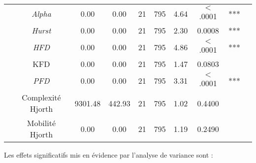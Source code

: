 \begin{table}[!t]
\begin{tabular}{|l|*{9}{c|}}
\hline
& \textit{Alpha} & 0.00 & 0.00 & 21 & 795 & 4.64 & $<$.0001 & *** \\ 
& \textit{Hurst} & 0.00 & 0.00 & 21 & 795 & 2.30 & 0.0008 & *** \\ 
& \textit{HFD} & 0.00 & 0.00 & 21 & 795 & 4.86 & $<$.0001 & *** \\ 
& KFD & 0.00 & 0.00 & 21 & 795 & 1.47 & 0.0803 & \\ 
& \textit{PFD} & 0.00 & 0.00 & 21 & 795 & 3.31 & $<$.0001 & *** \\ 
& Complexité Hjorth & 9301.48 & 442.93 & 21 & 795 & 1.02 & 0.4400 & \\ 
& Mobilité Hjorth & 0.00 & 0.00 & 21 & 795 & 1.19 & 0.2490 & \\ 
\hline
\end{tabular}

\end{table}

Les effets significatifs mis en évidence par l'analyse de variance sont : 

